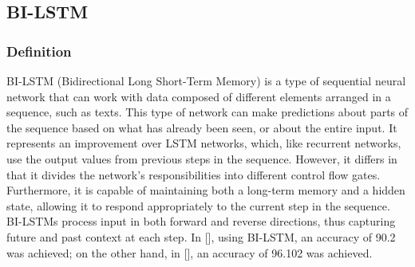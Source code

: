 \subsection{BI-LSTM}
\subsubsection{Definition}

BI-LSTM (Bidirectional Long Short-Term Memory) is a type of sequential neural network that can work with data 
composed of different elements arranged in a sequence, such as texts. This type of network can make predictions 
about parts of the sequence based on what has already been seen, or about the entire input. It represents an improvement 
over LSTM networks, which, like recurrent networks, use the output values from previous steps in the sequence. However,
it differs in that it divides the network's responsibilities into different control flow gates. Furthermore, it is capable of maintaining both a long-term memory and a hidden state, allowing it to respond appropriately to the current step in the sequence. BI-LSTMs process input in both forward and reverse directions, thus capturing future and past context at each step. In [], using BI-LSTM, an accuracy of 90.2 was achieved; on the other hand, in [], an accuracy of 96.102 was achieved.



